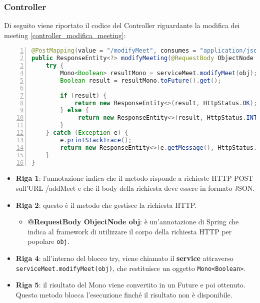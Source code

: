\subsubsection{Controller}
Di seguito viene riportato il codice del Controller riguardante la modifica dei meeting \ref{controller_modifica_meeting}: 
\begin{lstlisting}[language=java, frame=lines, basicstyle=\ttfamily\scriptsize, numbers=left,
    caption={controller modifica meeting}, label={controller_modifica_meeting}]
@PostMapping(value = "/modifyMeet", consumes = "application/json")
public ResponseEntity<?> modifyMeeting(@RequestBody ObjectNode obj) {
    try {   
        Mono<Boolean> resultMono = serviceMeet.modifyMeet(obj); 
        Boolean result = resultMono.toFuture().get();
    
        if (result) {
            return new ResponseEntity<>(result, HttpStatus.OK);
        } else {
             return new ResponseEntity<>(result, HttpStatus.INTERNAL_SERVER_ERROR);
        }  
    } catch (Exception e) {
        e.printStackTrace();
        return new ResponseEntity<>(e.getMessage(), HttpStatus.INTERNAL_SERVER_ERROR);
    }
}
\end{lstlisting}
\begin{itemize}
    \item \textbf{Riga 1}:
    l'annotazione indica che il metodo risponde a richieste HTTP POST sull'URL /addMeet 
    e che il body della richiesta deve essere in formato JSON.
  
    \item \textbf{Riga 2}:
    questo è il metodo che gestisce la richiesta HTTP. 
        \begin{itemize}
            
            \item \textbf{@RequestBody ObjectNode obj}: è un'annotazione di Spring che indica al framework di 
            utilizzare il corpo della richiesta HTTP per popolare \texttt{obj}.
            
        \end{itemize}
  
    \item \textbf{Riga 4}:
    all'interno del blocco try, viene chiamato il \textbf{service} attraverso
    \texttt{serviceMeet.modifyMeet(obj)}, che restituisce un oggetto 
    \texttt{Mono\textless{}Boolean\textgreater{}}. 
  
    \item \textbf{Riga 5}:
    il risultato del Mono viene convertito in un Future e poi ottenuto. Questo metodo blocca l'esecuzione 
    finché il risultato non è disponibile.
\end{itemize}